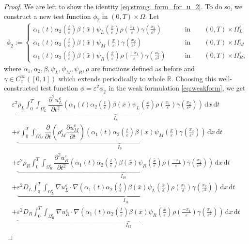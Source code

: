 \documentclass[10pt,a4paper]{amsart}
\newcommand{\di}[1]{\,\mathrm{d}#1}
\def\es{\varepsilon}
\def\oll{\Omega_L^\varepsilon}
\def\omm{\Omega_M^\varepsilon}
\def\orr{\Omega_R^\varepsilon}
\begin{document}
\begin{proof}
We are left to show the identity \eqref{eq:strong_form_for_u_2}. To do so, we construct a new test function $\phi_2$ in $(0,T)\times\Omega$.
Let
\begin{align*}
    \phi_2:=\begin{cases} 
      \alpha_1(t)\alpha_2(\frac{t}{\es})\beta(\bar x) \psi_L(\frac{\bar x}{\es})\rho(\frac{x_1}{\es})\gamma(\frac{x_2}{\es^2}) &  \qquad \mbox{in}\qquad (0,T)\times \oll\\
      \alpha_1(t)\alpha_2(\frac{t}{\es})\beta(\bar x) \psi_M(\frac{x}{\es})\gamma(\frac{x_2}{\es^2}) & \qquad \mbox{in}\qquad (0,T)\times \omm\\
      \alpha_1(t)\alpha_2(\frac{t}{\es})\beta(\bar x) \psi_R(\frac{\bar x}{\es})\rho(\frac{-x_1}{\es})\gamma(\frac{x_2}{\es^2}) & \qquad \mbox{in}\qquad (0,T)\times \orr,
   \end{cases}
\end{align*}
where $\alpha_1,\alpha_2,\beta, \psi_L,\psi_M,\psi_R,\rho$ are functions defined as before and $\gamma\in C_c^{\infty}([0,1])$ which extends periodically to whole $\mathbb{R}$. Choosing this well-constructed test function $\phi=\es^2 \phi_2$ in the weak formulation \eqref{eq:weakform}, we get
 \begin{multline}\label{eq:phi2weakform}
   \underbrace{ \es^2 \rho_L\int_0^T\int_{\oll}  \dfrac{\partial^2u_L^\es}{\partial t^2} (\alpha_1(t)\alpha_2(\frac{t}{\es})\beta(\bar x) \psi_L(\frac{\bar x}{\es})\rho(\frac{x_1}{\es})\gamma(\frac{x_2}{\es^2}))\di{x}\di{t}}_{I_8}\\
    +  \underbrace{\es\int_0^T\int_{\omm}  \dfrac{\partial}{\partial t}\left({\rho_M^\es} \dfrac{\partial u_M^\es}{\partial t}\right) ( \alpha_1(t)\alpha_2(\frac{t}{\es})\beta(\bar x) \psi_M(\frac{x}{\es})\gamma(\frac{x_2}{\es^2}))\di{x}\di{t}}_{I_9} \\
    +   \underbrace{ \es^2 \rho_R\int_0^T\int_{\orr} \dfrac{\partial^2u_R^\es}{\partial t^2} ( \alpha_1(t)\alpha_2(\frac{t}{\es})\beta(\bar x) \psi_R(\frac{\bar x}{\es})\rho(\frac{-x_1}{\es})\gamma(\frac{x_2}{\es^2}))\di{x}\di{t}}_{I_{10}}\\
    +\underbrace{\es^2 D_L\int_0^T\int_{\oll}\nabla u_L^\es \cdot \nabla ( \alpha_1(t)\alpha_2(\frac{t}{\es})\beta(\bar x) \psi_L(\frac{\bar x}{\es})\rho(\frac{x_1}{\es})\gamma(\frac{x_2}{\es^2}))   \di{x}\di{t}}_{I_{11}}\\
    + \underbrace{\es^2 D_R\int_0^T\int_{\orr} \nabla u_R^\es\cdot\nabla ( \alpha_1(t)\alpha_2(\frac{t}{\es})\beta(\bar x) \psi_R(\frac{\bar x}{\es})\rho(\frac{-x_1}{\es})\gamma(\frac{x_2}{\es^2})) \di{x}\di{t}}_{I_{12}} \\

\end{multline}
\end{proof}
\end{document}
